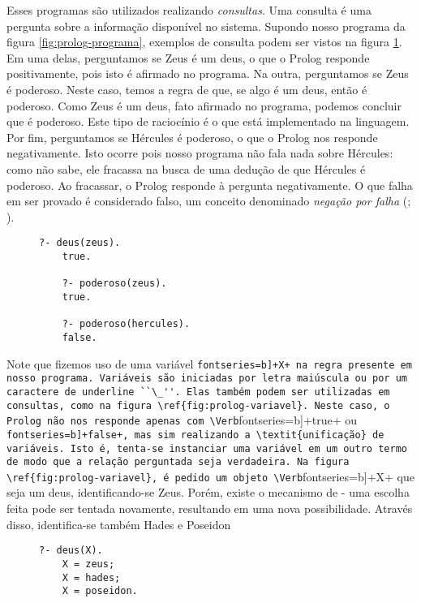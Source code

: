 	Esses programas são utilizados realizando \textit{consultas}. Uma consulta é uma pergunta sobre a informação disponível no sistema. Supondo nosso programa da figura \ref{fig:prolog-programa}, exemplos de consulta podem ser vistos na figura \ref{fig:prolog-consulta}. Em uma delas, perguntamos se Zeus é um deus, o que o Prolog responde positivamente, pois isto é afirmado no programa. Na outra, perguntamos se Zeus é poderoso. Neste caso, temos a regra de que, se algo é um deus, então é poderoso. Como Zeus é um deus, fato afirmado no programa, podemos concluir que é poderoso. Este tipo de raciocínio é o que está implementado na linguagem. Por fim, perguntamos se Hércules é poderoso, o que o Prolog nos responde negativamente. Isto ocorre pois nosso programa não fala nada sobre Hércules: como não sabe, ele fracassa na busca de uma dedução de que Hércules é poderoso. Ao fracassar, o Prolog responde à pergunta negativamente. O que falha em ser provado é considerado falso, um conceito denominado \textit{negação por falha} (\citealp[p.~113-115]{prolog-art}; \citealp[seção ~10.3]{prolog-learnnow}).
	
	\begin{figure}
	\begin{Verbatim}[fontseries=b,gobble=1]
	?- deus(zeus).
	true.
	
	?- poderoso(zeus).
	true.
	
	?- poderoso(hercules).
	false.
	\end{Verbatim}
	\caption{}
	\label{fig:prolog-consulta}
	\end{figure}

	Note que fizemos uso de uma variável \Verb[fontseries=b]+X+ na regra presente em nosso programa. Variáveis são iniciadas por letra maiúscula ou por um caractere de underline ``\_''. Elas também podem ser utilizadas em consultas, como na figura \ref{fig:prolog-variavel}. Neste caso, o Prolog não nos responde apenas com \Verb[fontseries=b]+true+ ou \Verb[fontseries=b]+false+, mas sim realizando a \textit{unificação} de variáveis. Isto é, tenta-se instanciar uma variável em um outro termo de modo que a relação perguntada seja verdadeira. Na figura \ref{fig:prolog-variavel}, é pedido um objeto \Verb[fontseries=b]+X+ que seja um deus, identificando-se Zeus. Porém, existe o mecanismo de  - uma escolha feita pode ser tentada novamente, resultando em uma nova possibilidade. Através disso, identifica-se também Hades e Poseidon \citep[seção ~2.2]{prolog-learnnow}
	
	\begin{figure}[h]
	\begin{Verbatim}[fontseries=b,gobble=1]
	?- deus(X).
	X = zeus;
	X = hades;
	X = poseidon.
	\end{Verbatim}
	\caption{}
	\label{fig:prolog-variavel}
	\end{figure}

